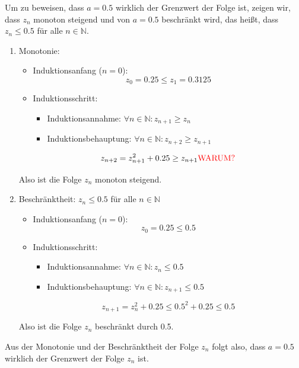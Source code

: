 \documentclass[a4paper, 12pt]{book}
\begin{document}
Um zu beweisen, dass \(a = 0.5\) wirklich der Grenzwert der Folge
ist, zeigen wir, dass \(z_{n}\) monoton steigend und von \(a = 0.5\)
beschränkt wird, das heißt, dass \(z_{n} \leq 0.5\) für alle
\(n\mathbb{ \in N}\).

\begin{enumerate}
\item
  Monotonie:

\begin{itemize}
\item Induktionsanfang (\(n = 0\)):
\[z_{0} = 0.25 \leq z_{1} = 0.3125\]
\item Induktionsschritt:
\begin{itemize}
\item Induktionsannahme: \(\forall n \in \mathbb{N}:z_{n + 1} \geq z_{n}\)
\item Induktionsbehauptung:
\(\forall n \in \mathbb{N}:z_{n + 2} \geq z_{n + 1}\)
\end{itemize}
\[z_{n + 2} = z_{n + 1}^{2} + 0.25 \geq z_{n + 1}\text{\textcolor{red}{WARUM?}}\]
\end{itemize}
Also ist die Folge \(z_{n}\) monoton steigend.

\item
  Beschränktheit: \(z_{n} \leq 0.5\) für alle \(n\mathbb{ \in N}\)
\begin{itemize}
\item Induktionsanfang (\(n = 0\)):
\[z_{0} = 0.25 \leq 0.5\]
\item Induktionsschritt:
\begin{itemize}
\item Induktionsannahme: \(\forall n \in \mathbb{N}:z_{n} \leq 0.5\)
\item Induktionsbehauptung:
\(\forall n \in \mathbb{N}:z_{n + 1} \leq 0.5\)
\end{itemize}
\[z_{n + 1} = z_{n}^{2} + 0.25 \leq {0.5}^{2} + 0.25 \leq 0.5\]
\end{itemize}
Also ist die Folge \(z_{n}\) beschränkt durch 0.5.
\end{enumerate}

Aus der Monotonie und der Beschränktheit der Folge \(z_{n}\) folgt also,
dass \(a = 0.5\) wirklich der Grenzwert der Folge \(z_{n}\) ist.
\hfill\blacksquare

\end{document}
